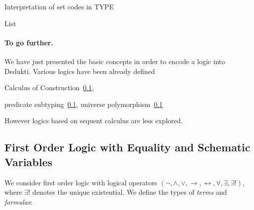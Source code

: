 \documentclass{article}
\begin{document}
	Interpretation of set codes in TYPE
	
	
	
	
	
	
	
	
	
	
	
	
	
	
	
	List
	
	
	
	
	\paragraph{To go further.}
	We have just presented the basic concepts in order to encode a logic into Dedukti.
	Various logics have been already defined
	
	
	
	Calculus of Construction~\ref{}, 
	
	predicate subtyping~\ref{}, universe polymorphism~\ref{}
	
	However logics based on sequent calculus are less explored.
	
	\subsection{First Order Logic with Equality and Schematic Variables}
	We consider first order logic with logical operators $(\neg, \land, \lor, \rightarrow, \leftrightarrow, \forall, \exists, \exists !)$, where $\exists !$ denotes the unique existential. We define the types of \textit{terms} and \textit{formulas}:
\end{document}
